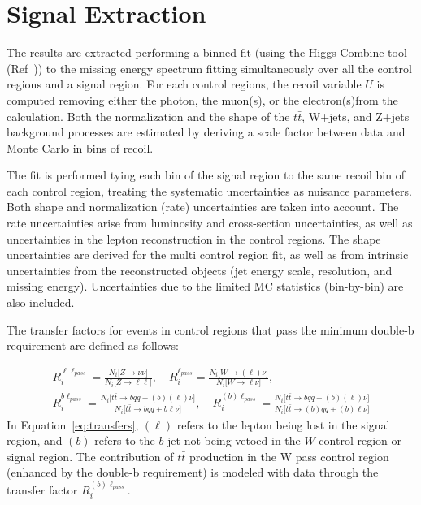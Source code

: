 \clearpage
\section{Signal Extraction}
\label{sec:fitdesc}
The results are extracted performing a binned fit (using the Higgs Combine tool (Ref~\cite{COMBINE})) to the missing energy spectrum fitting simultaneously over all the control regions and a signal region.
For each control regions, the recoil variable $U$ is computed removing either the photon, the muon(s), or the electron(s)from the \MET calculation. Both the normalization and the shape of the $t\bar{t}$, W+jets, and Z+jets background processes are estimated by deriving a scale factor between data and Monte Carlo in bins of recoil. 

 The fit is performed tying each \MET bin of the signal region to the same recoil bin of each control region, treating the systematic uncertainties as nuisance parameters. 
Both shape and normalization (rate) uncertainties are taken into account. The rate uncertainties arise from luminosity and cross-section uncertainties, as well as uncertainties in the lepton reconstruction in the control regions. The shape uncertainties are derived for the multi control region fit, as well as from intrinsic uncertainties from the reconstructed objects (jet energy scale, resolution, and missing energy). Uncertainties due to the limited MC statistics (bin-by-bin) are also included.


The transfer factors for events in control regions that pass the minimum double-b requirement are defined as follows:

\begin{gather}
  R_i^{\ell\ell_{pass}} = \frac{N_i\big[Z\rightarrow\nu\nu\big]}{N_i\big[Z\rightarrow\ell\ell\big]}, \quad 
  R_i^{\ell_{pass}} = \frac{N_i\big[W\rightarrow(\ell)\nu\big]}{N_i\big[W\rightarrow\ell\nu\big]}, \quad \nonumber \\
  R_i^{b\ell_{pass}} = \frac{N_i\big[t\bar{t}\rightarrow bqq+(b)(\ell)\nu\big]}{N_i\big[t\bar{t}\rightarrow bqq+b\ell\nu\big]}, \quad 
  R_i^{(b)\ell_{pass}} = \frac{N_i\big[t\bar{t}\rightarrow bqq+(b)(\ell)\nu\big]}{N_i\big[t\bar{t}\rightarrow (b)qq+(b)\ell\nu\big]}
\label{eq:transfers}
\end{gather}
In Equation~\ref{eq:transfers}, $(\ell)$ refers to the lepton being lost in the signal region, and $(b)$ refers to the $b$-jet not being vetoed in the $W$ control region or signal region. The contribution of $t\bar{t}$ production in the W pass control region (enhanced by the double-b requirement) is modeled with data through the transfer factor $R_i^{(b)\ell_{pass}}$.

